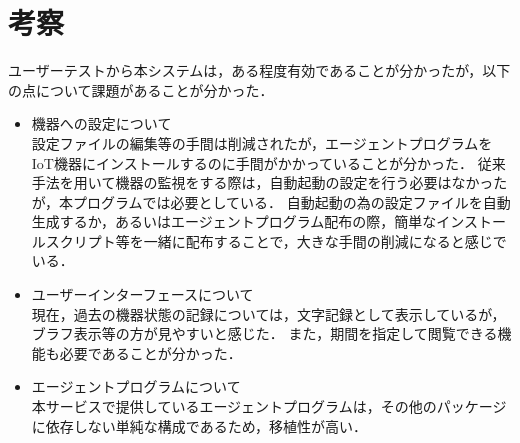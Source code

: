 \section{考察}
ユーザーテストから本システムは，ある程度有効であることが分かったが，以下の点について課題があることが分かった．
\begin{itemize}
\item 機器への設定について\\
	設定ファイルの編集等の手間は削減されたが，エージェントプログラムをIoT機器にインストールするのに手間がかかっていることが分かった．
	従来手法を用いて機器の監視をする際は，自動起動の設定を行う必要はなかったが，本プログラムでは必要としている．
	自動起動の為の設定ファイルを自動生成するか，あるいはエージェントプログラム配布の際，簡単なインストールスクリプト等を一緒に配布することで，大きな手間の削減になると感じでいる．
\item ユーザーインターフェースについて\\
	現在，過去の機器状態の記録については，文字記録として表示しているが，ブラフ表示等の方が見やすいと感じた．
	また，期間を指定して閲覧できる機能も必要であることが分かった．
\item エージェントプログラムについて\\
	本サービスで提供しているエージェントプログラムは，その他のパッケージに依存しない単純な構成であるため，移植性が高い．
\end{itemize}


